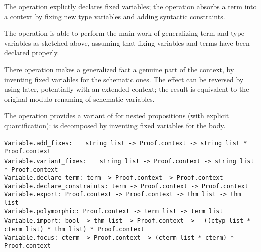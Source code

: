 \begin{isabellebody}
\begin{isamarkuptext}
  The  operation explictly declares fixed
  variables; the  operation absorbs a term into
  a context by fixing new type variables and adding syntactic
  constraints.

  The  operation is able to perform the main work of
  generalizing term and type variables as sketched above, assuming
  that fixing variables and terms have been declared properly.

  There  operation makes a generalized fact a genuine
  part of the context, by inventing fixed variables for the schematic
  ones.  The effect can be reversed by using  later,
  potentially with an extended context; the result is equivalent to
  the original modulo renaming of schematic variables.

  The  operation provides a variant of 
  for nested propositions (with explicit quantification):  is
  decomposed by inventing fixed variables  for the body.%
\end{isamarkuptext}%
\isamarkuptrue%
%
\isadelimmlref
%
\endisadelimmlref
%
\isatagmlref
%
\begin{isamarkuptext}%
\begin{mldecls}
  \verb|Variable.add_fixes: |\isasep\isanewline%
\verb|  string list -> Proof.context -> string list * Proof.context| \\
  \verb|Variable.variant_fixes: |\isasep\isanewline%
\verb|  string list -> Proof.context -> string list * Proof.context| \\
  \verb|Variable.declare_term: term -> Proof.context -> Proof.context| \\
  \verb|Variable.declare_constraints: term -> Proof.context -> Proof.context| \\
  \verb|Variable.export: Proof.context -> Proof.context -> thm list -> thm list| \\
  \verb|Variable.polymorphic: Proof.context -> term list -> term list| \\
  \verb|Variable.import: bool -> thm list -> Proof.context ->|\isasep\isanewline%
\verb|  ((ctyp list * cterm list) * thm list) * Proof.context| \\
  \verb|Variable.focus: cterm -> Proof.context -> (cterm list * cterm) * Proof.context| \\
  \end{mldecls}


\end{isamarkuptext}
\end{isabellebody}
